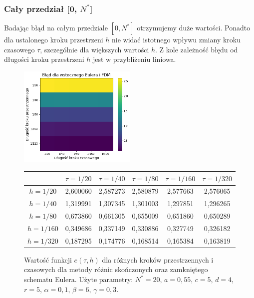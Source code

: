 \documentclass{article}
\begin{document}
\subsubsection{Cały przedział [0, $N^{*}$]}
		Badając błąd na całym przedziale $[0,N^{*}]$ otrzymujemy duże wartości. Ponadto dla ustalonego kroku przestrzeni $h$ nie widać istotnego wpływu zmiany kroku czasowego $\tau$, szczególnie dla większych wartości $h$. Z kole zależność błędu od długości kroku przestrzeni $h$ jest w przybliżeniu liniowa.
		\begin{figure}[h!]
			\caption{Wartość funkcji $e(\tau,h)$ dla różnych kroków przestrzennych i czasowych dla metody różnic skończonych oraz zamkniętego schematu Eulera. Użyte parametry: $N^{*}=20$, $a=0,55$, $c=5$, $d=4$, $r=5$, $\alpha=0,1$, $\beta=6$, $\gamma=0,3$. }
			\centering
			\includegraphics[width=0.5\textwidth]{images/blad_fdm_euler.pdf}
			\begin{tabular}{|c|c|c|c|c|c|}
				\hline
				&    $\tau=1/20$ &    $\tau=1/40$ &    $\tau=1/80$ &   $\tau=1/160$ &   $\tau=1/320$ \\
				\hline 
				$h=1/20$  &  2,600060 &	2,587273 &	2,580879 &	2,577663 &	2,576065 \\
				\hline
				$h=1/40$  &  1,319991 &	1,307345 &	1,301003 &	1,297851 &	1,296265 \\
				\hline
				$h=1/80$  &  0,673860 &	0,661305 &	0,655009 &	0,651860 &	0,650289 \\
				\hline
				$h=1/160$ &  0,349686 &	0,337149 &	0,330886 &	0,327749 &	0,326182 \\
				\hline
				$h=1/320$ &  0,187295 &	0,174776 &	0,168514 &	0,165384 &	0,163819 \\
				\hline
			\end{tabular}
		\end{figure}
\end{document}
